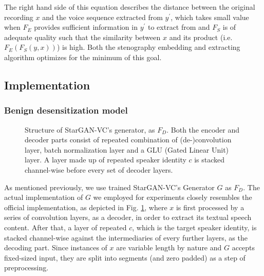 \documentclass[journal]{IEEEtran} %
\begin{document}
The right hand side of this equation describes the distance between the original recording $x$ and the voice sequence extracted from $y^{\prime}$, which takes small value when $F_E$ provides sufficient information in $y^{\prime}$ to extract from and $F_S$ is of adequate quality such that the similarity between $x$ and its product (i.e. $F_E(F_S(y, x))$) is high. Both the stenography embedding and extracting algorithm optimizes for the minimum of this goal.

\subsection{Implementation}

\subsubsection{Benign desensitization model}

\begin{figure}[!t]
    \caption{Structure of StarGAN-VC's generator, as $F_D$. Both the encoder and decoder parts consist of repeated combination of (de-)convolution layer, batch normalization layer and a GLU (Gated Linear Unit) layer. A layer made up of repeated speaker identity $c$ is stacked channel-wise before every set of decoder layers.}
    \label{fig:sgvc_impl}
\end{figure}

As mentioned previously, we use trained StarGAN-VC's Generator $G$ as $F_D$. The actual implementation of $G$ we employed for experiments closely resembles the official implementation, as depicted in Fig. \ref{fig:sgvc_impl}, where $x$ is first processed by a series of convolution layers, as a decoder, in order to extract its textual speech content. After that, a layer of repeated $c$, which is the target speaker identity, is stacked channel-wise against the intermediaries of every further layers, as the decoding part. Since instances of $x$ are variable length by nature and $G$ accepts fixed-sized input, they are split into segments (and zero padded) as a step of preprocessing.
\end{document}
